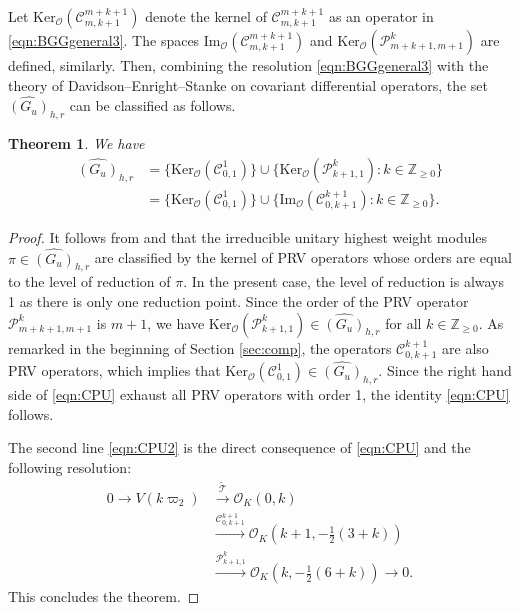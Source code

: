 \documentclass[reqno,11pt]{amsart}
\newtheorem{thm}[equation]{Theorem}
\theoremstyle{remark}
\numberwithin{equation}{section}
\newcommand{\Z}{\mathbb{Z}}
\newcommand{\Cal}{\mathcal}
\renewcommand{\Im}{\mathrm{Im}}
\newcommand{\To}{\longrightarrow}
\newcommand{\wT}{\widetilde{\Cal{T}}}
\newcommand{\Ker}{\mathrm{Ker}}
\begin{document}
Let
$\Ker_{\Cal{O}}(\Cal{C}^{m+k+1}_{m,k+1})$ denote
the kernel of 
$\Cal{C}^{m+k+1}_{m,k+1}$ as an operator in 
\eqref{eqn:BGGgeneral3}. The spaces
 $\Im_{\Cal{O}}(\Cal{C}^{m+k+1}_{m,k+1})$ and 
$\Ker_{\Cal{O}}(\Cal{P}^{k}_{m+k+1,m+1})$ are defined, similarly.
Then, combining the resolution \eqref{eqn:BGGgeneral3}
with the theory of Davidson--Enright--Stanke \cite{DES90, DES91}
on covariant differential operators, 
the set $\widehat{(G_u)}_{h,r}$ can be classified as follows.

\begin{thm}\label{thm:UHW}
We have
\begin{align}
\widehat{(G_u)}_{h,r}
&=
\{ \Ker_{\Cal{O}}(\Cal{C}^{1}_{0,1})\}
\cup
\{ \Ker_{\Cal{O}}(\Cal{P}^{k}_{k+1,1}):k \in \Z_{\geq 0}\}\label{eqn:CPU}\\[3pt]
&=
\{ \Ker_{\Cal{O}}(\Cal{C}^{1}_{0,1})\}
\cup
\{ \Im_{\Cal{O}}(\Cal{C}^{k+1}_{0,k+1}):k \in \Z_{\geq 0}\}. \label{eqn:CPU2}
\end{align}
\end{thm}

\begin{proof}
It follows from \cite[Thm.\ 3.2]{DES90} and \cite{EJ90} that
the irreducible unitary highest weight modules $\pi \in 
\widehat{(G_u)}_{h,r}$ are classified by the kernel of PRV operators
whose orders are equal to the level of reduction of $\pi$.
In the present case, the level of reduction is always 1 
as there is only one reduction point.
Since the order of the PRV operator $\Cal{P}^{k}_{m+k+1,m+1}$ is $m+1$, 
we have $\Ker_{\Cal{O}}(\Cal{P}^{k}_{k+1,1}) \in \widehat{(G_u)}_{h,r}$
for all $k \in \Z_{\geq 0}$.
As remarked in the beginning of Section \ref{sec:comp},
the operators $\Cal{C}^{k+1}_{0,k+1}$ are also PRV operators,
which implies that $\Ker_{\Cal{O}}(\Cal{C}^{1}_{0,1}) \in  \widehat{(G_u)}_{h,r}$.
Since the right hand side of \eqref{eqn:CPU} exhaust all PRV operators with order 1,
the identity \eqref{eqn:CPU} follows.

The second line \eqref{eqn:CPU2} is the direct consequence of
\eqref{eqn:CPU} and the following resolution:
\begin{equation}\label{eqn:BGGgeneral4}
\begin{aligned}
0\To
V(k \varpi_2)
&\stackrel{\wT}{\To}
\Cal{O}_K(0, k)\\
&\stackrel{\Cal{C}^{k+1}_{0,k+1}}{\To}
\Cal{O}_K(k+1, -\tfrac{1}{2}(3+k))\\[5pt]
&\stackrel{\Cal{P}^{k}_{k+1,1}}{\To}
\Cal{O}_K(k, -\tfrac{1}{2}(6+k))
\To 0.
\end{aligned}
\end{equation}
This concludes the theorem.
\end{proof}
\end{document}
